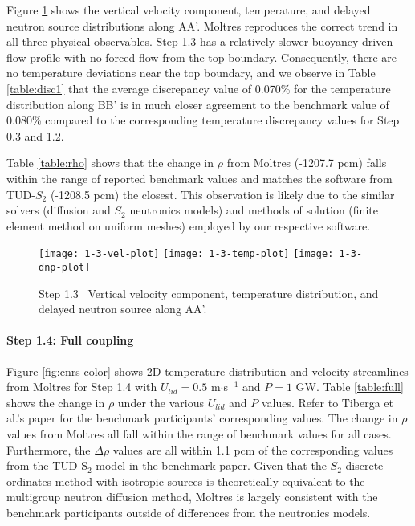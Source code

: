 Figure \ref{fig:1.3} shows the vertical velocity component, temperature, and
delayed neutron source distributions along AA'.
Moltres reproduces the correct trend in all three physical
observables. Step 1.3 has a relatively slower buoyancy-driven flow profile with
no forced flow from the top boundary. Consequently, there are no temperature
deviations near the top boundary, and we observe in Table \ref{table:disc1} that
the average discrepancy value of 0.070\% for the temperature distribution along
BB' is in much closer agreement to the benchmark value of 0.080\% compared to
the corresponding temperature discrepancy values for Step 0.3 and 1.2.

Table \ref{table:rho} shows that the change in $\rho$ from
Moltres (-1207.7 pcm) falls within the range of reported benchmark values and
matches the software from TUD-$S_2$ (-1208.5 pcm) the closest. This observation is likely
due to the similar solvers (diffusion and $S_2$ neutronics models) and
methods of solution (finite element method on uniform meshes) employed by our
respective software.
%
\begin{figure}[htb]
	\centering
	\texttt{[image: 1-3-vel-plot]}
	\texttt{[image: 1-3-temp-plot]}
	\texttt{[image: 1-3-dnp-plot]}
	\caption{Step 1.3 \textemdash\ Vertical velocity component, temperature distribution,
	and delayed neutron source along AA'.}
	\label{fig:1.3}
\end{figure}

\FloatBarrier

\paragraph{Step 1.4: Full coupling}

Figure \ref{fig:cnrs-color} shows 2D temperature distribution and velocity
streamlines from Moltres for Step 1.4 with $U_{lid} = 0.5$ m$\cdot$s$^{-1}$ and
$P = 1$ GW. Table \ref{table:full} shows the change in $\rho$ under the various
$U_{lid}$ and $P$ values. Refer to Tiberga et al.'s paper
\cite{tiberga_results_2020} for the benchmark participants' corresponding
values. The change in $\rho$ values from Moltres all fall within the range of
benchmark values
for all cases. Furthermore, the $\Delta\rho$ values are all within 1.1 pcm of
the corresponding values from the TUD-S$_2$ model in the benchmark paper. Given
that the $S_2$ discrete ordinates method with isotropic sources is theoretically equivalent to the
multigroup neutron diffusion method, Moltres is largely
consistent with the benchmark participants outside of differences from the
neutronics models.


